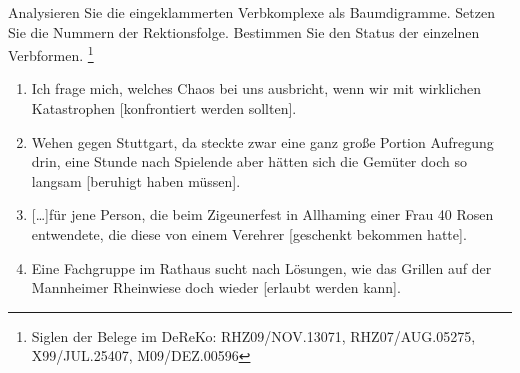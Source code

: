 \begin{sloppypar}
 \label{exc:phrasen05} Analysieren Sie die eingeklammerten Verbkomplexe als Baumdigramme.
Setzen Sie die Nummern der Rektionsfolge.
Bestimmen Sie den Status der einzelnen Verbformen.%
\footnote{Siglen der Belege im DeReKo: RHZ09\slash NOV.13071, RHZ07\slash AUG.05275, X99\slash JUL.25407, M09\slash DEZ.00596}

\begin{enumerate}
  \item Ich frage mich, welches Chaos bei uns ausbricht, wenn wir mit wirklichen Katastrophen [konfrontiert werden sollten].
  \item Wehen gegen Stuttgart, da steckte zwar eine ganz große Portion Aufregung drin, eine Stunde nach Spielende aber hätten sich die Gemüter doch so langsam [beruhigt haben müssen].
  \item{} [\ldots]für jene Person, die beim Zigeunerfest in Allhaming einer Frau 40 Rosen entwendete, die diese von einem Verehrer [geschenkt bekommen hatte].
  \item Eine Fachgruppe im Rathaus sucht nach Lösungen, wie das Grillen auf der Mannheimer Rheinwiese doch wieder [erlaubt werden kann].
\end{enumerate}

\end{sloppypar}
